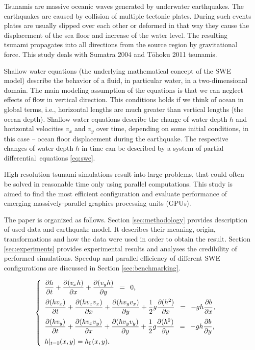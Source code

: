 \documentclass{usiinftr}
\begin{document}
Tsunamis are massive oceanic waves generated by underwater earthquakes. The earthquakes are caused by
collision of multiple tectonic plates. During such events plates are usually slipped over each other or deformed
in that way they cause the displacement of the sea floor and increase of the water level. The resulting
tsunami propagates into all directions from the source region by gravitational force. This study deals
with Sumatra 2004 and T\={o}hoku 2011 tsunamis.

Shallow water equations \cite{nummethods} (the underlying mathematical concept of the {SWE} model) describe the behavior of a fluid, in particular water, in a two-dimensional domain.
The main modeling  assumption of the equations is that we can neglect effects of flow in vertical direction. This conditions 
holds if we think of ocean in global terms, i.e., horizontal lengths  are much greater than vertical lengths (the ocean depth).
Shallow water equations describe the change of water depth $h$ and horizontal velocities $v_x$ and $v_y$  over time,  depending on some
initial conditions, in this case -- ocean floor displacement during the earthquake. The respective changes
of water depth $h$ in time can be described by a system of partial differential~equations \eqref{eq:swe}.

High-resolution tsunami simulations result into large problems, that could often be solved in reasonable time only using parallel
computations. This study is aimed to find the most efficient configuration and evaluate performance
of emerging massively-parallel graphics processing units (GPUs).

The paper is organized as follows. Section \ref{sec:methodology} provides description of used data and earthquake model.
It describes their meaning, origin, transformations and how the data were used in order to obtain the result.
Section \ref{sec:experiments} provides experimental results and analyses the credibility of performed simulations.
Speedup and parallel efficiency of different SWE configurations are discussed in Section \ref{sec:benchmarking}.

\begin{equation} \left\{
  \begin{array}{l} \label{eq:swe}
     \displaystyle \frac{\partial h}{\partial t} + \frac{\partial (v_x h)}{\partial x} + \frac{\partial (v_y h)}{\partial y} \enskip = \enskip 0,  \\[1em]
     \displaystyle \frac{\partial (h v_x)}{\partial t} + \frac{\partial (h v_x v_x)}{\partial x}  + \frac{\partial (h v_y v_x)}{\partial y}
         + \frac{1}{2} g \frac{\partial (h^2)}{\partial x}  \enskip = \enskip - gh \frac{\partial b}{\partial x}, \\[1em]
      \displaystyle \frac{\partial (h v_y)}{\partial t} + \frac{\partial (h v_x v_y)}{\partial x}  + \frac{\partial (h v_y v_y)}{\partial y}
         + \frac{1}{2} g  \frac{\partial (h^2)}{\partial y} \enskip = \enskip - gh \frac{\partial b}{\partial y}, \\[1em]
      \displaystyle h|_{t=0}(x,y) = h_0(x,y).
  \end{array}
  \right.
\end{equation}
\end{document}
